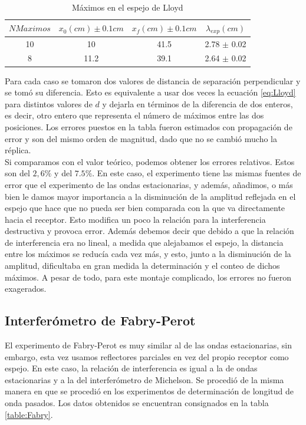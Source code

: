 \documentclass[%
 reprint,
 amsmath,amssymb,
 aps,
]{revtex4-1}
\begin{document}
\begin{table}[h!]
\centering
 \begin{tabular}{|c|c|c|c|} 
 \hline
 $N Maximos$& $x_0(cm) \pm 0.1cm$ & $x_f(cm) \pm 0.1cm$ & $\lambda_{exp} (cm)$ \\ [0.5ex] 
 \hline\hline
 10 & 10 & 41.5 & 2.78 $\pm$ 0.02\\
 8 & 11.2 & 39.1 & 2.64 $\pm$ 0.02\\
[1ex] 
 \hline
 \end{tabular}
 \caption{Máximos en el espejo de Lloyd}
 \label{table:Lloyd}
\end{table}

Para cada caso se tomaron dos valores de distancia de separación perpendicular y se tomó su diferencia. Esto es equivalente a usar dos veces la ecuación \ref{eq:Lloyd} para distintos valores de $d$ y dejarla en términos de la diferencia de dos enteros, es decir, otro entero que representa el número de máximos entre las dos posiciones. Los errores puestos en la tabla fueron estimados con propagación de error y son del mismo orden de magnitud, dado que no se cambió mucho la réplica.\\

Si comparamos con el valor teórico, podemos obtener los errores relativos. Estos son del $2,6\%$ y del 
$7.5\%$. En este caso, el experimento tiene las mismas fuentes de error que el experimento de las ondas estacionarias, y además, añadimos, o más bien le damos mayor importancia a la disminución de la amplitud reflejada en el espejo que hace que no pueda ser bien comparada con la que va directamente hacia el receptor. Esto modifica un poco la relación para la interferencia destructiva y provoca error. Además debemos decir que debido a que la relación de interferencia era no lineal, a medida que alejabamos el espejo, la distancia entre los máximos se reducía cada vez más, y esto, junto a la disminución de la amplitud, dificultaba en gran medida la determinación y el conteo de dichos máximos. A pesar de todo, para este montaje complicado, los errores no fueron exagerados.\\

\subsection{\label{sec:level2}Interferómetro de Fabry-Perot}
El experimento de Fabry-Perot es muy similar al de las ondas estacionarias, sin embargo, esta vez usamos reflectores parciales en vez del propio receptor como espejo. En este caso, la relación de interferencia es igual a la de ondas estacionarias y a la del interferómetro de Michelson. Se procedió de la misma manera en que se procedió en los experimentos de determinación de longitud de onda pasados. Los datos obtenidos se encuentran consignados en la tabla \ref{table:Fabry}.\\
\end{document}
